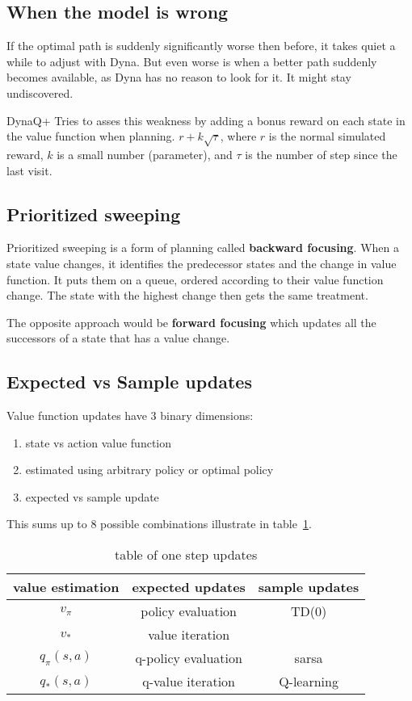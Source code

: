\subsection{When the model is wrong}
If the optimal path is suddenly significantly worse then before, it takes quiet a while to adjust with Dyna. But even worse is when a better path suddenly becomes available, as Dyna has no reason to look for it. It might stay undiscovered.

DynaQ+ Tries to asses this weakness by adding a bonus reward on each state in the value function when planning. $r + k \sqrt{\tau}$, where $r$ is the normal simulated reward, $k$ is a small number (parameter), and $\tau$ is the number of step since the last visit.

\subsection{Prioritized sweeping}


Prioritized sweeping is a form of planning called \textbf{backward focusing}. When a state value changes, it identifies the predecessor states and the change in value function. It puts them on a queue, ordered according to their value function change. The state with the highest change then gets the same treatment. 


The opposite approach would be \textbf{forward focusing} which updates all the successors of a state that has a value change.

\subsection{Expected vs Sample updates}
Value function updates have 3 binary dimensions:
\begin{center}
\begin{enumerate}
	\item state vs action value function
	\item estimated using arbitrary policy or optimal policy
	\item expected vs sample update
\end{enumerate}
\end{center}

This sums up to 8 possible combinations illustrate in table~\ref{tab:table of one step updates}.

\begin{center}
	\begin{table}[H]
	\begin{tabular}{ c | c | c }
		value estimation & expected updates & sample updates \\
		\hline
		$v_\pi$ & policy evaluation & TD(0) \\ 
		$v_*$ & value iteration & \\  
		$q_\pi(s, a)$ & q-policy evaluation & sarsa \\
		$q_*(s, a)$ & q-value iteration & Q-learning	
	\end{tabular}
	\label{tab:table of one step updates}
	\caption{table of one step updates}
	\end{table}
\end{center}

